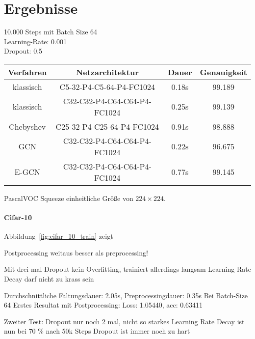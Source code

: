 \section{Ergebnisse}
\label{ergebnisse}

10.000 Steps mit Batch Size 64\\
Learning-Rate: 0.001\\
Dropout: 0.5\\

\begin{tabular}{cccc}
  \toprule
  Verfahren & Netzarchitektur & Dauer & Genauigkeit\\
  \midrule
  klassisch & C5-32-P4-C5-64-P4-FC1024 & 0.18s & 99.189\\
  klassisch & C32-C32-P4-C64-C64-P4-FC1024 & 0.25s & 99.139\\
  Chebyshev & C25-32-P4-C25-64-P4-FC1024 & 0.91s & 98.888\\
  GCN & C32-C32-P4-C64-C64-P4-FC1024 & 0.22s & 96.675\\
  E-GCN & C32-C32-P4-C64-C64-P4-FC1024 & 0.77s & 99.145\\
  \bottomrule
\end{tabular}


PascalVOC Squeeze einheitliche Größe von $224 \times 224$.

\paragraph{\gls{Cifar}-10}

Abbildung~\ref{fig:cifar_10_train} zeigt


Postprocessing weitaus besser als preprocessing!

Mit drei mal Dropout kein Overfitting, trainiert allerdings langsam
Learning Rate Decay darf nicht zu krass sein

Durchschnittliche Faltungsdauer: 2.05s, Preprocessingdauer: 0.35s
Bei Batch-Size 64
Erstes Resultat mit Postprocessing:
Loss: 1.05440, acc: 0.63411

Zweiter Test:
Dropout nur noch 2 mal, nicht so starkes Learning Rate Decay
ist nun bei 70 \% nach 50k Steps
Dropout ist immer noch zu hart
